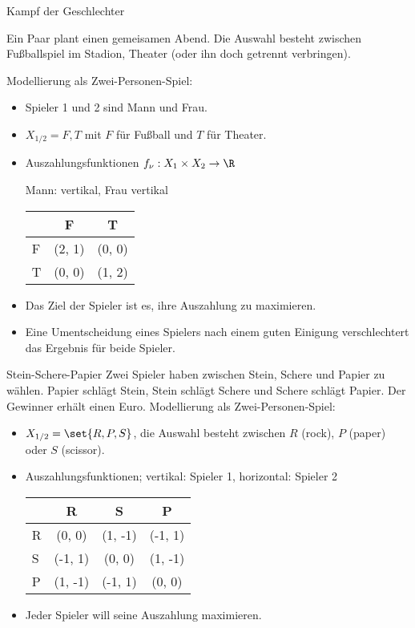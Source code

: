 \begin{beispiel} Kampf der Geschlechter

Ein Paar plant einen gemeisamen Abend. Die Auswahl besteht zwischen Fußballspiel im Stadion, Theater (oder ihn doch getrennt verbringen). 

Modellierung als Zwei-Personen-Spiel:
\begin{itemize}
\item Spieler 1 und 2 sind Mann und Frau. 
\item $X_{1/2} = {F, T}$ mit $F$ für Fußball und $T$ für Theater. 
\item Auszahlungsfunktionen $f_{\nu}: X_{1} \times X_{2} \to \R$

Mann: vertikal, Frau vertikal

  \begin{tabular}[h!]{l| c c}
    & F & T \\\hline 
    F & (2, 1)& (0, 0) \\
    T & (0, 0)&  (1, 2)
  \end{tabular}
\item Das Ziel der Spieler ist es, ihre Auszahlung zu maximieren. 
\item Eine Umentscheidung eines Spielers nach einem guten Einigung verschlechtert das Ergebnis für beide Spieler.
\end{itemize}
\end{beispiel}
\begin{beispiel} Stein-Schere-Papier
  Zwei Spieler haben zwischen Stein, Schere und Papier zu wählen. Papier schlägt Stein, Stein schlägt Schere und Schere schlägt Papier. Der Gewinner erhält einen Euro. Modellierung als Zwei-Personen-Spiel:
  \begin{itemize}
  \item $X_{1/2} = \set{R,P,S}$, die Auswahl besteht zwischen $R$ (rock), $P$ (paper) oder $S$ (scissor). 
    \item Auszahlungsfunktionen;
vertikal: Spieler 1, horizontal: Spieler 2

  \begin{tabular}[h!]{l| c c c}
    & R & S & P \\\hline 
    R & (0, 0)& (1, -1) & (-1, 1) \\
    S & (-1, 1)&  (0, 0)&  (1, -1)\\ 
    P & (1, -1)&  (-1, 1)&  (0, 0)
  \end{tabular}
\item Jeder Spieler will seine Auszahlung maximieren.
  \end{itemize}
\end{beispiel}

